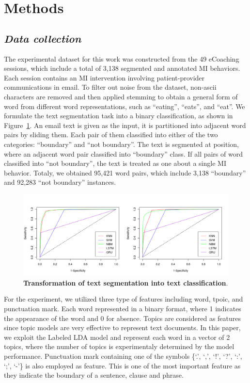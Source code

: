 \documentclass{amia}
\begin{document}
\section*{Methods}
\subsection*{\textit{Data collection}}
The experimental dataset for this work was constructed from the 49 eCoaching sessions, which include a total of 3,138 segmented and annotated MI behaviors. Each session contains an MI intervention involving patient-provider communications in email. To filter out noise from the dataset, non-ascii characters are removed and then applied stemming to obtain a general form of word from different word representations, such as ``eating'', ``eats'', and ``eat''. We formulate the text segmentation task into a binary classification, as shown in Figure~\ref{fig:classifier}. An email text is given as the input, it is partitioned into adjacent word pairs by sliding them. Each pair of them classified into either of the two categories: ``boundary'' and ``not boundary''. The text is segmented at position, where an adjacent word pair classified into ``boundary'' class. If all pairs of word classified into ``not boundary'', the text is treated as one about a single MI behavior. Totaly, we obtained 95,421 word pairs, which include 3,138 ``boundary'' and 92,283 ``not boundary'' instances.    

\begin{figure}[!htb]
    \centering
    \includegraphics[width=1.0\textwidth]{figures/roc-curves.png}
    \caption{\textbf{Transformation of text segmentation into text classification}.}
    \label{fig:classifier}
\end{figure}


For the experiment, we utilized three type of features including word, tpoic, and punctuation mark. Each word represented in a binary format, where 1 indicates the appearance of the word and 0 for absence. Topics are considered as features since topic models are very effective\cite{kotov2015interpretable,hashimoto2016topic,lu2016modeling} to represent text documents. In this paper, we exploit the Labeled LDA model\cite{kotov2015interpretable} and represent each word in a vector of 2 topics, where the number of topics is experimentaly determined by the model performance. Punctuation mark containing one of the symbols \{`.', `,', `!', `?', `:', `;', `-'\} is also employed as feature. This is one of the most important feature as they indicate the boundary of a sentence, clause and phrase.   
\end{document}
